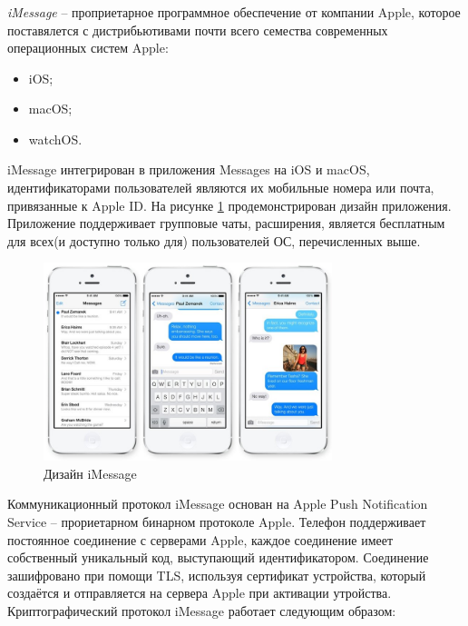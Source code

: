 \subsubsection{}
\label{sec:analysis:research:analogs:imessage}

\textit{iMessage} -- проприетарное программное обеспечение от компании Apple, которое поставялется с дистрибьютивами почти всего семества современных операционных систем Apple:
\begin{itemize}
	\item iOS;
	\item macOS;
	\item watchOS.
\end{itemize}

iMessage интегрирован в приложения Messages на iOS и macOS, идентификаторами пользователей являются их мобильные номера или почта, привязанные к Apple ID. На рисунке \ref{sec:analysis:research:analogs:imessage:design} продемонстрирован дизайн приложения. Приложение поддерживает групповые чаты, расширения, является бесплатным для всех(и доступно только для) пользователей ОС, перечисленных выше.

\begin{figure}[h]
  \centering
    \includegraphics[width=0.75\textwidth]{inc/img/imdesign.jpeg}
  \caption{Дизайн iMessage}
  \label{sec:analysis:research:analogs:imessage:design}
\end{figure}

Коммуникационный протокол iMessage основан на Apple Push Notification Service -- прориетарном бинарном протоколе Apple. Телефон поддерживает постоянное соединение с серверами Apple, каждое соединение имеет собственный уникальный код, выступающий идентификатором. Соединение зашифровано при помощи TLS, используя сертификат устройства, который создаётся и отправляется на сервера Apple при активации утройства.
Криптографический протокол iMessage работает следующим образом:

